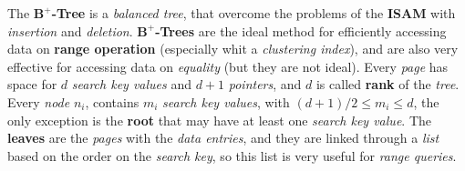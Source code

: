 \documentclass{article}
\begin{document}
The \textbf{$\mathbf{B^+}$-Tree} is a \emph{balanced tree}, that overcome the problems of the \textbf{ISAM} with \emph{insertion} and \emph{deletion}. \textbf{$\mathbf{B^+}$-Trees} are the ideal method for efficiently accessing data on \textbf{range operation} (especially whit a \emph{clustering index}), and are also very effective for accessing data on \emph{equality} (but they are not ideal). Every \emph{page} has space for $d$ \emph{search key values} and $d+1$ \emph{pointers}, and $d$ is called \textbf{rank} of the \emph{tree}. Every \emph{node} $n_i$, contains $m_i$ \emph{search key values}, with $(d+1)/2 \leq m_i \leq d$, the only exception is the \textbf{root} that may have at least one \emph{search key value}. The \textbf{leaves} are the \emph{pages} with the \emph{data entries}, and they are linked through a \emph{list} based on the order on the \emph{search key}, so this list is very useful for \emph{range queries}. 
\end{document}
